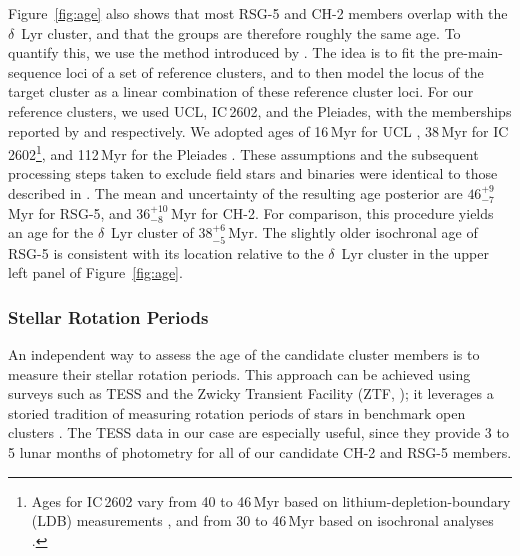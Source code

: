 \documentclass[12pt,twocolumn]{aastex63}
\begin{document}
Figure~\ref{fig:age} also shows that most RSG-5 and
CH-2 members overlap with the $\delta$~Lyr cluster, and that the groups are therefore
roughly the same age.  To quantify this, we use the method
introduced by \citet[][their Section~6.3]{gagne_mutau_2020}.  The
idea is to fit the pre-main-sequence loci of a set of
reference clusters, and to then model the locus of the target cluster
as a linear combination of these reference cluster loci.  For our
reference clusters, we used UCL, IC\,2602, and the Pleiades, with the
memberships reported by \citet{Damiani2019} and
\cite{CantatGaudin2018a} respectively.  We adopted ages of 16\,Myr for
UCL \citep{pecaut_star_2016}, 38\,Myr for IC\,2602\footnote{ Ages for
IC\,2602 vary from 40 to 46\,Myr based on lithium-depletion-boundary
(LDB) measurements \citep{dobbie_ic_2010,randich_gaiaeso_2018}, and
from 30 to 46\,Myr based on isochronal analyses
\citep{stauffer_rotational_1997,david_ages_2015,bossini_age_2019}.},
and 112\,Myr for the Pleiades \citep{dahm_2015}.  These assumptions
and the subsequent processing steps taken to exclude field stars and binaries
were identical to those
described in \citet{bouma_kep1627_2022}.  The mean and 
uncertainty of the resulting age posterior are $46^{+9}_{-7}$\,Myr for
RSG-5, and $36^{+10}_{-8}$\,Myr for CH-2.  For comparison, this
procedure yields an age for the $\delta$~Lyr cluster of
$38^{+6}_{-5}$\,Myr.  
The slightly older isochronal age of RSG-5 is
consistent with its location
relative to the $\delta$~Lyr cluster in
the upper left panel of Figure~\ref{fig:age}.


\subsubsection{Stellar Rotation Periods}
\label{sec:rotation}

An independent way to assess the age of the candidate cluster members
is to measure their stellar rotation periods.  This approach can be
achieved using surveys such as TESS \citep{ricker_transiting_2015} and
the Zwicky Transient Facility (ZTF, \citealt{bellm_zwicky_2019});
it leverages a storied tradition of measuring rotation periods of stars in
benchmark open clusters \citep[see {e.g.},][]{skumanich_time_1972,curtis_rup147_2020}.  The TESS data in
our case are especially useful, since they provide 3 to 5 lunar months
of photometry for all of our candidate CH-2 and RSG-5 members.
\end{document}
